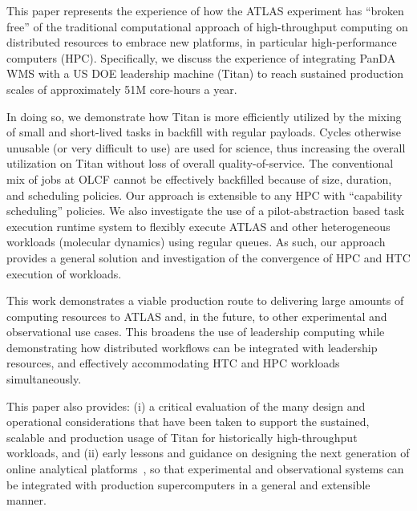 
This paper represents the experience of how the ATLAS experiment has ``broken
free'' of the traditional computational approach of high-throughput computing
on distributed resources to embrace new platforms, in particular
high-performance computers (HPC). Specifically, we discuss the experience of
integrating PanDA WMS with a US DOE leadership machine (Titan) to reach
sustained production scales of approximately 51M core-hours a year.

In doing so, we demonstrate how Titan is more efficiently utilized by the
mixing of small and short-lived tasks in backfill with regular payloads.
Cycles otherwise unusable (or very difficult to use) are used for science,
thus increasing the overall utilization on Titan without loss of overall
quality-of-service. The conventional mix of jobs at OLCF cannot be
effectively backfilled because of size, duration, and scheduling policies.
Our approach is extensible to any HPC with ``capability scheduling''
policies.  We also investigate the use of a pilot-abstraction based task
execution runtime system to flexibly execute ATLAS and other heterogeneous
workloads (molecular dynamics) using regular queues. As such, our approach
provides a general solution and investigation of the convergence of HPC and
HTC execution of workloads.

This work demonstrates a viable production route to delivering large amounts
of computing resources to ATLAS and, in the future, to other experimental and
observational use cases.  This broadens the use of leadership computing while
demonstrating how distributed workflows can be integrated with leadership
resources, and effectively accommodating HTC and HPC workloads
simultaneously.

This paper also provides: (i) a critical evaluation of the many design and
operational considerations that have been taken to support the sustained,
scalable and production usage of Titan for historically high-throughput
workloads, and (ii) early lessons and guidance on designing the next
generation of online analytical platforms~\cite{foap-url},  so that
experimental and observational systems can be integrated with production
supercomputers in a general and extensible manner.
